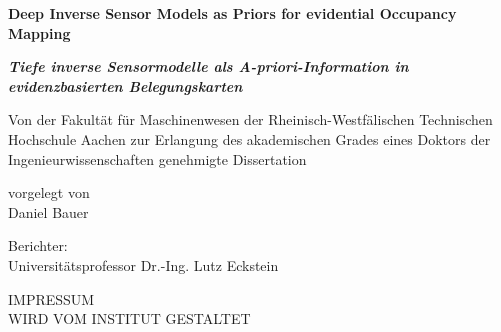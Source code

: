 
\begin{titlepage}
  \centering
  \begin{minipage}[t]{9.8cm}
      \begin{center}
          {\large \textbf{Deep Inverse Sensor Models as Priors for evidential Occupancy Mapping}}
          \bigskip
      \end{center}
  \end{minipage}
  \begin{minipage}[t]{9.8cm}
      \begin{center}
          {\large \textcolor{ikagrey}{\textit{\textbf{Tiefe inverse Sensormodelle als A-priori-Information in evidenzbasierten Belegungskarten}}}}
          \bigskip
      \end{center}
  \end{minipage}
  \vfill
  \begin{minipage}[t]{16.5cm}
      \begin{center}
          Von der Fakultät für Maschinenwesen der
          Rheinisch-Westfälischen Technischen Hochschule Aachen
          zur Erlangung des akademischen Grades eines Doktors der
          Ingenieurwissenschaften genehmigte Dissertation
      \end{center}
  \end{minipage}
  \vfill
  \begin{minipage}[t]{9.8cm}
      \begin{center}
      	vorgelegt von\\
      	\vspace{\baselineskip}
          Daniel Bauer
      \end{center}
  \end{minipage}
\vfill
	\begin{minipage}[t]{9.8cm}
		\begin{center}
			Berichter:\\
			\vspace{\baselineskip}
			Universitätsprofessor Dr.-Ing. Lutz Eckstein
		\end{center}
	\end{minipage}
  \vfill
\end{titlepage}
\newpage
\pagestyle{empty}
\vspace{10cm}
\begin{center}
  IMPRESSUM\\
  \bigskip
  WIRD VOM INSTITUT GESTALTET
\end{center}
\vfill
\restoregeometry
